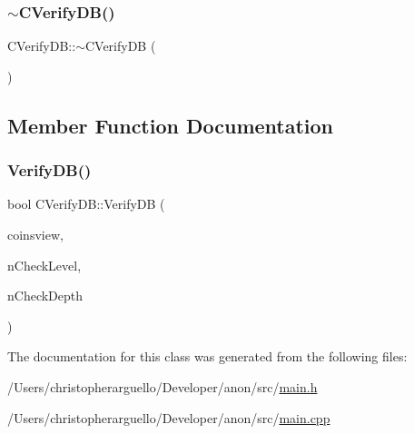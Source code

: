 \subsubsection{\texorpdfstring{$\sim$\+C\+Verify\+D\+B()}{~CVerifyDB()}}
{\footnotesize\ttfamily C\+Verify\+D\+B\+::$\sim$\+C\+Verify\+DB (\begin{DoxyParamCaption}{ }\end{DoxyParamCaption})}



\subsection{Member Function Documentation}
\mbox{\label{class_c_verify_d_b_a5d3e3ade35a14ddce2404e18e4b1df50}} 
\subsubsection{\texorpdfstring{Verify\+D\+B()}{VerifyDB()}}
{\footnotesize\ttfamily bool C\+Verify\+D\+B\+::\+Verify\+DB (\begin{DoxyParamCaption}\item[{\mbox{\hyperlink{class_c_coins_view}{C\+Coins\+View}} $\ast$}]{coinsview,  }\item[{int}]{n\+Check\+Level,  }\item[{int}]{n\+Check\+Depth }\end{DoxyParamCaption})}



The documentation for this class was generated from the following files\+:\begin{DoxyCompactItemize}
\item 
/\+Users/christopherarguello/\+Developer/anon/src/\mbox{\hyperlink{main_8h}{main.\+h}}\item 
/\+Users/christopherarguello/\+Developer/anon/src/\mbox{\hyperlink{main_8cpp}{main.\+cpp}}\end{DoxyCompactItemize}
